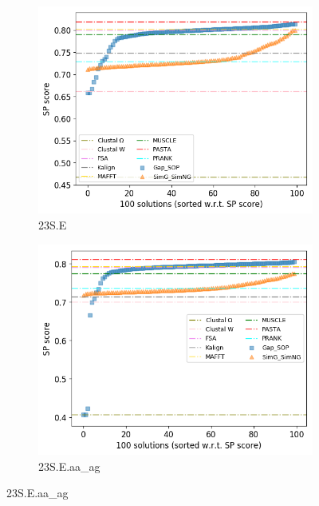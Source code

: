 \begin{figure}[!htbp]
	\centering
	\begin{adjustwidth}{-0.2cm}{}
		\begin{subfigure}{0.5\columnwidth}
			\includegraphics[width=\columnwidth]{Figure/summary/precomputedInit/23S.E/pairs_density_single_run}
			\caption{23S.E}
		\end{subfigure}	
		\begin{subfigure}{0.5\columnwidth}
			\includegraphics[width=\columnwidth]{Figure/summary/precomputedInit/23S.E.aa_ag/pairs_density_single_run}
			\caption{23S.E.aa\_ag}
		\end{subfigure}

\end{adjustwidth}
\end{figure}
